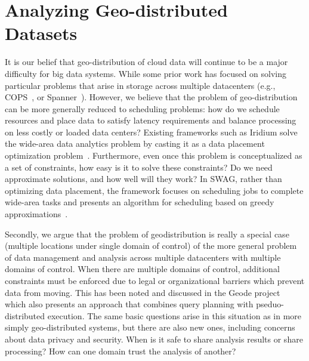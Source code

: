 \section{Analyzing Geo-distributed Datasets}
It is our belief that geo-distribution of cloud data will continue to
be a major difficulty for big data systems. While some prior work has
focused on solving particular problems that arise in storage across
multiple datacenters (e.g., COPS~\cite{Lloyd:2011:DSE:2043556.2043593}, or
Spanner~\cite{spanner-corbett}). However, we believe that the problem
of geo-distribution can be more generally reduced to scheduling
problems: how do we schedule resources and place data to satisfy
latency requirements and balance processing on less costly or loaded
data centers? Existing frameworks such as Iridium solve the wide-area
data analytics problem by casting it as a data placement optimization
problem~\cite{iridium-pu}.  Furthermore, even once this problem is
conceptualized as a set of constraints, how easy is it to solve these
constraints? Do we need approximate solutions, and how well will they
work?  In SWAG, rather than optimizing data placement, the framework
focuses on scheduling jobs to complete wide-area tasks and presents an
algorithm for scheduling based on greedy approximations~\cite{swag-hung}.

Secondly, we argue that the problem of geodistribution is really a
special case (multiple locations under single domain of control) of
the more general problem of data management and analysis across
multiple datacenters with multiple domains of control. When there are
multiple domains of control, additional constraints must be enforced
due to legal or organizational barriers which prevent data from
moving. This has been noted and discussed in the Geode
project~\cite{geode-vulimiri} which also presents an approach that
combines query planning with pseduo-distributed execution.  The same
basic questions arise in this situation as in more simply
geo-distributed systems, but there are also new ones, including concerns
about data privacy and security. When is it safe to share analysis
results or share processing? How can one domain trust the analysis of
another?
